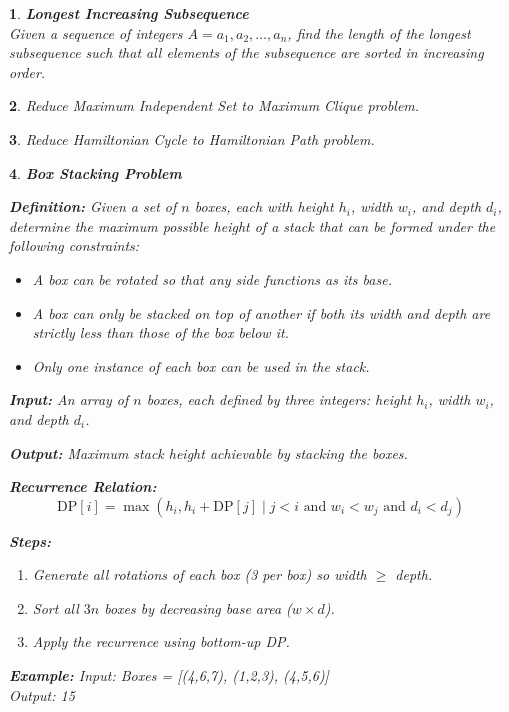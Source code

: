 \documentclass[%
addpoints]{exam}
\theoremstyle{problem}
\newtheorem{p}{}
\begin{document}
\begin{p}
\textbf{Longest Increasing Subsequence}\\[1ex]
Given a sequence of integers $A = a_1, a_2, \ldots, a_n$, find the length of the longest subsequence such that all elements of the subsequence are sorted in increasing order.
\hfill \end{p}

\begin{p}
Reduce Maximum Independent Set to Maximum Clique problem.
\hfill \end{p}

\begin{p}
Reduce Hamiltonian Cycle to Hamiltonian Path problem.
\hfill \end{p}

\newpage


\begin{p}
\textbf{Box Stacking Problem}

\textbf{Definition:} Given a set of $n$ boxes, each with height $h_i$, width $w_i$, and depth $d_i$, determine the maximum possible height of a stack that can be formed under the following constraints:
\begin{itemize}
\item A box can be rotated so that any side functions as its base.
\item A box can only be stacked on top of another if both its width and depth are strictly less than those of the box below it.
\item Only one instance of each box can be used in the stack.
\end{itemize}

\textbf{Input:} An array of $n$ boxes, each defined by three integers: height $h_i$, width $w_i$, and depth $d_i$.

\textbf{Output:} Maximum stack height achievable by stacking the boxes.

\textbf{Recurrence Relation:}
\[ \text{DP}[i] = \max (h_i, h_i + \text{DP}[j] \mid j < i \text{ and } w_i < w_j \text{ and } d_i < d_j ) \]

\textbf{Steps:}
\begin{enumerate}
\item Generate all rotations of each box (3 per box) so width $\geq$ depth.
\item Sort all $3n$ boxes by decreasing base area ($w \times d$).
\item Apply the recurrence using bottom-up DP.
\end{enumerate}

\textbf{Example:} Input: Boxes = [(4,6,7), (1,2,3), (4,5,6)]\\
Output: 15
\hfill \end{p}
\end{document}
